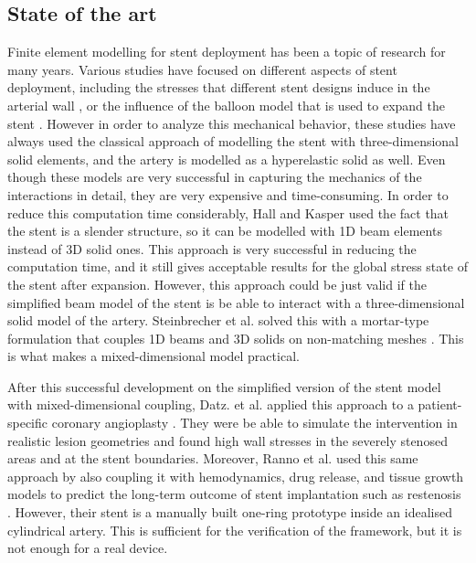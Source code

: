 \subsection{State of the art}
\label{sec:state-of-the-art}

Finite element modelling for stent deployment has been a topic of research for many years. Various studies have focused on different aspects of stent deployment, including the stresses that different stent designs induce in the arterial wall \citep{lally2005}, or the influence of the balloon model that is used to expand the stent \citep{schiavone2015}. However in order to analyze this mechanical behavior, these studies have always used the classical approach of modelling the stent with three-dimensional solid elements, and the artery is modelled as a hyperelastic solid as well. Even though these models are very successful in capturing the mechanics of the interactions in detail, they are very expensive and time-consuming. In order to reduce this computation time considerably, Hall and Kasper \citep{hall2006} used the fact that the stent is a slender structure, so it can be modelled with 1D beam elements instead of 3D solid ones. This approach is very successful in reducing the computation time, and it still gives acceptable results for the global stress state of the stent after expansion. However, this approach could be just valid if the simplified beam model of the stent is be able to interact with a three-dimensional solid model of the artery. Steinbrecher et al. solved this with a mortar-type formulation that couples 1D beams and 3D solids on non-matching meshes \citep{steinbrecher2020}. This is what makes a mixed-dimensional model practical.

After this successful development on the simplified version of the stent model with mixed-dimensional coupling, Datz. et al. applied this approach to a patient-specific coronary angioplasty \citep{datz2025}. They were be able to simulate the intervention in realistic lesion geometries and found high wall stresses in the severely stenosed areas and at the stent boundaries. Moreover, Ranno et al. used this same approach by also coupling it with hemodynamics, drug release, and tissue growth models to predict the long-term outcome of stent implantation such as restenosis \citep{ranno2025}. However, their stent is a manually built one-ring prototype inside an idealised cylindrical artery. This is sufficient for the verification of the framework, but it is not enough for a real device.

